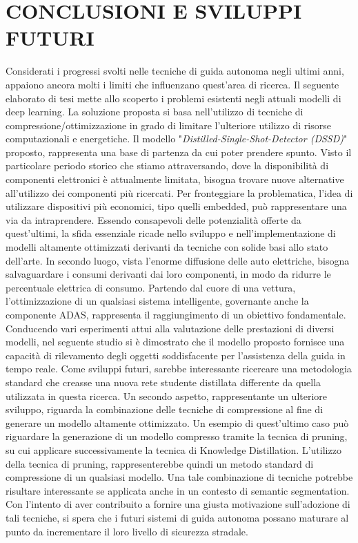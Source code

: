 
\chapter{CONCLUSIONI E SVILUPPI FUTURI}
\label{Capitolo5}
\thispagestyle{empty}
Considerati i progressi svolti nelle tecniche di guida autonoma negli ultimi anni, appaiono ancora molti i limiti che influenzano quest'area di ricerca. Il seguente elaborato di tesi mette allo scoperto i problemi esistenti negli attuali modelli di deep learning. La soluzione proposta si basa nell'utilizzo di tecniche di compressione/ottimizzazione in grado di limitare l'ulteriore utilizzo di risorse computazionali e energetiche. Il modello "\emph{Distilled-Single-Shot-Detector (DSSD)}" proposto, rappresenta una base di partenza da cui poter prendere spunto. Visto il particolare periodo storico che stiamo attraversando, dove la disponibilità di componenti elettronici è attualmente limitata, bisogna trovare nuove alternative all'utilizzo dei componenti più ricercati. Per fronteggiare la problematica, l'idea di utilizzare dispositivi più economici, tipo quelli embedded, può rappresentare una via da intraprendere.
Essendo consapevoli delle potenzialità offerte da quest'ultimi, la sfida essenziale ricade nello sviluppo e nell'implementazione di modelli altamente ottimizzati derivanti da tecniche con solide basi allo stato dell'arte. In secondo luogo, vista l'enorme diffusione delle auto elettriche, bisogna salvaguardare i consumi derivanti dai loro componenti, in modo da ridurre le percentuale elettrica di consumo. Partendo dal cuore di una vettura, l'ottimizzazione di un qualsiasi sistema intelligente, governante anche la componente ADAS,  rappresenta il raggiungimento di un obiettivo fondamentale. Conducendo vari esperimenti attui alla valutazione delle prestazioni di diversi modelli, nel seguente studio si è dimostrato che il modello proposto fornisce una capacità di rilevamento degli oggetti soddisfacente per l'assistenza della guida in tempo reale.
Come sviluppi futuri, sarebbe interessante ricercare una metodologia standard che creasse una nuova rete studente distillata differente da quella utilizzata in questa ricerca. Un secondo aspetto, rappresentante un ulteriore sviluppo, riguarda la combinazione delle tecniche di compressione al fine di generare un modello altamente ottimizzato. Un esempio di quest'ultimo caso può riguardare la generazione di un modello compresso tramite la tecnica di pruning, su cui applicare successivamente la tecnica di Knowledge Distillation. L'utilizzo della tecnica di pruning, rappresenterebbe quindi un metodo standard di compressione di un qualsiasi modello. Una tale combinazione di tecniche potrebbe risultare interessante se applicata anche in un contesto di semantic segmentation. Con l'intento di aver contribuito a fornire una giusta motivazione sull'adozione di tali tecniche, si spera che i futuri sistemi di guida autonoma possano maturare al punto da incrementare il loro livello di sicurezza stradale.